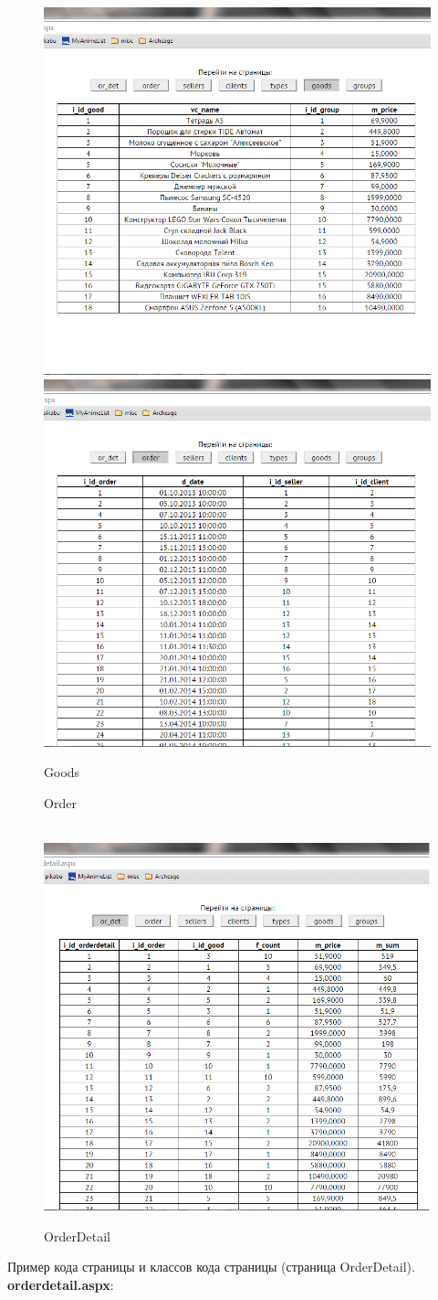 \documentclass[pscyr]{hedlab}
\begin{document}
  \newpage
  
  \begin{figure}[h!]
    \center
    \includegraphics[width=.47\textwidth]{goods} \hspace{1em}
    \includegraphics[width=.47\textwidth]{order} \\
    \parbox{.47\textwidth}{\caption{Goods}} \hspace{1em}
    \parbox{.47\textwidth}{\caption{Order}} \\
    \includegraphics[width=.6\textwidth]{orderdetail}
    \caption{OrderDetail}
  \end{figure}
  
  Пример кода страницы и классов кода страницы (страница OrderDetail).\\
  \textbf{orderdetail.aspx}:
  
  
\end{document}
